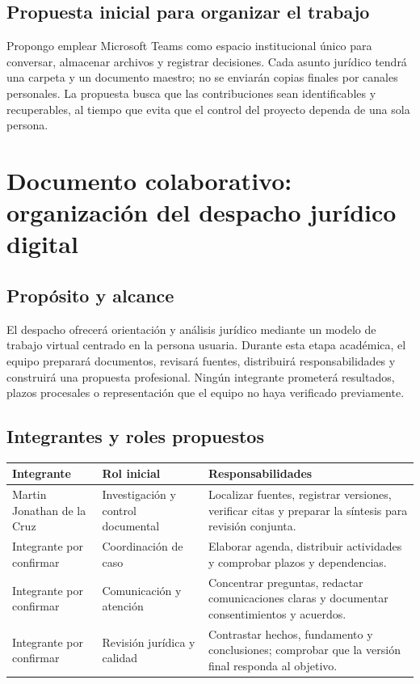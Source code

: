 \documentclass[
  spanish,
  letterpaper, oneside
]{article}
\begin{document}
\subsection{Propuesta inicial para organizar el trabajo}

Propongo emplear Microsoft Teams como espacio institucional único para conversar,
almacenar archivos y registrar decisiones. Cada asunto jurídico tendrá una carpeta y
un documento maestro; no se enviarán copias finales por canales personales. La
propuesta busca que las contribuciones sean identificables y recuperables, al tiempo
que evita que el control del proyecto dependa de una sola persona.

\section{Documento colaborativo: organización del despacho jurídico digital}

\subsection{Propósito y alcance}

El despacho ofrecerá orientación y análisis jurídico mediante un modelo de trabajo
virtual centrado en la persona usuaria. Durante esta etapa académica, el equipo
preparará documentos, revisará fuentes, distribuirá responsabilidades y construirá
una propuesta profesional. Ningún integrante prometerá resultados, plazos procesales
o representación que el equipo no haya verificado previamente.

\subsection{Integrantes y roles propuestos}

\begin{tabularx}{\textwidth}{p{3cm}p{3.6cm}X}
\toprule
\textbf{Integrante} & \textbf{Rol inicial} & \textbf{Responsabilidades} \\
\midrule
Martin Jonathan de la Cruz & Investigación y control documental & Localizar fuentes, registrar versiones, verificar citas y preparar la síntesis para revisión conjunta. \\
Integrante por confirmar & Coordinación de caso & Elaborar agenda, distribuir actividades y comprobar plazos y dependencias. \\
Integrante por confirmar & Comunicación y atención & Concentrar preguntas, redactar comunicaciones claras y documentar consentimientos y acuerdos. \\
Integrante por confirmar & Revisión jurídica y calidad & Contrastar hechos, fundamento y conclusiones; comprobar que la versión final responda al objetivo. \\
\bottomrule
\end{tabularx}
\end{document}
